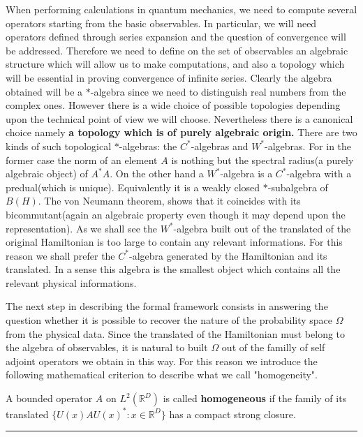 When performing calculations in quantum mechanics, we need to compute several operators starting from the basic observables. In particular, we will need operators defined through series expansion and the question of convergence will be addressed. Therefore we need to define on the set of observables an algebraic structure which will allow us to make computations, and also a topology which will be essential in proving convergence of infinite series. Clearly the algebra obtained will be a $*$-algebra since we need to distinguish real numbers from the complex ones. However there is a wide choice of possible topologies depending upon the technical point of view we will choose. Nevertheless there is a canonical choice namely \textbf{a topology which is of purely algebraic origin.} There are two kinds of such topological $*$-algebras: the $C^*$-algebras and $W^*$-algebras. For in the former case the norm of an element $A$ is nothing but the spectral radius(a purely algebraic object) of $A^* A$. On the other hand a $W^*$-algebra is a $C^*$-algebra with a predual(which is unique). Equivalently it is a weakly closed $*$-subalgebra of $B(H)$. The von Neumann theorem, shows that it coincides with its bicommutant(again an algebraic property even though it may depend upon the representation). As we shall see the $W^*$-algebra built out of the translated of the original Hamiltonian is too large to contain any relevant informations. For this reason we shall prefer the $C^*$-algebra generated by the Hamiltonian and its translated. In a sense this algebra is the smallest object which contains all the relevant physical informations.

The next step in describing the formal framework consists in answering the question whether it is possible to recover the nature of the probability space $\Omega$ from the physical data. Since the translated of the Hamiltonian must belong to the algebra of observables, it is natural to built $\Omega$ out of the familly of self adjoint operators we obtain in this way. For this reason we introduce the following mathematical criterion to describe what we call "homogeneity".
\begin{defn} A bounded operator $A$ on $L^2(\mathbb{R}^D)$ is called \textbf{homogeneous} if the family of its translated $\{U(x)AU(x)^*:x\in \mathbb{R}^D\}$ has a compact strong closure.
\end{defn}


\noindent\rule{\textwidth}{1pt}
\newline
